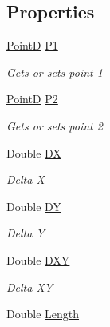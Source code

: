 \subsection*{Properties}
\begin{DoxyCompactItemize}
\item 
\hyperlink{class_pdf_file_writer_1_1_point_d}{PointD} \hyperlink{class_pdf_file_writer_1_1_line_d_ac8339997350c1b6ab278a58c3e45fa77}{P1}
\begin{DoxyCompactList}\small\item\em Gets or sets point 1 \end{DoxyCompactList}\item 
\hyperlink{class_pdf_file_writer_1_1_point_d}{PointD} \hyperlink{class_pdf_file_writer_1_1_line_d_af1c3aaed1d379ac1ac42ec105d2f7e08}{P2}
\begin{DoxyCompactList}\small\item\em Gets or sets point 2 \end{DoxyCompactList}\item 
Double \hyperlink{class_pdf_file_writer_1_1_line_d_a4fa33f2e2fb3bb322284c46048120826}{DX}
\begin{DoxyCompactList}\small\item\em Delta X \end{DoxyCompactList}\item 
Double \hyperlink{class_pdf_file_writer_1_1_line_d_a96cd4a613afbf3edd66685fc7d652379}{DY}
\begin{DoxyCompactList}\small\item\em Delta Y \end{DoxyCompactList}\item 
Double \hyperlink{class_pdf_file_writer_1_1_line_d_aa8ac34ba7b33c19586b7c015a0f2dfd7}{D\+XY}
\begin{DoxyCompactList}\small\item\em Delta XY \end{DoxyCompactList}\item 
Double \hyperlink{class_pdf_file_writer_1_1_line_d_affec785f565e67003a1776827b59052d}{Length}

\end{DoxyCompactItemize}
